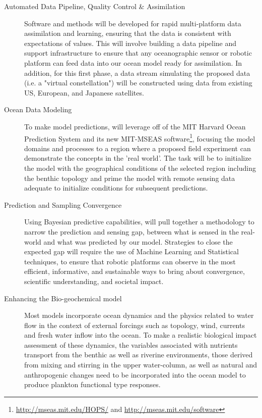 \begin{description}

\item[Automated Data Pipeline, Quality Control \& Assimilation]
  Software and methods will be developed for rapid multi-platform data
  assimilation and learning, ensuring that the data is consistent with
  expectations of values. This will involve building a data pipeline
  and support infrastructure to ensure that any oceanographic sensor
  or robotic platform can feed data into our ocean model ready for
  assimilation. In addition, for this first phase, a data stream
  simulating the proposed \sml data (i.e. a "virtual constellation")
  will be constructed using data from existing US, European, and
  Japanese satellites. %

\item[Ocean Data Modeling] To make model predictions, \pro will
  leverage off of the MIT Harvard Ocean Prediction System and its new
  MIT-MSEAS software\footnote{\url{http://mseas.mit.edu/HOPS/} and
    \url{http://mseas.mit.edu/software}}, focusing the model domains
  and processes to a region where a proposed field experiment can
  demonstrate the concepts in the 'real world'. The task will be to
  initialize the model with the geographical conditions of the
  selected region including the benthic topology and prime the model
  with remote sensing data adequate to initialize conditions for
  subsequent predictions.

\item[Prediction and Sampling Convergence] Using Bayesian predictive
  capabilities, \pro will pull together a methodology to narrow the
  prediction and sensing gap, between what is sensed in the real-world
  and what was predicted by our model. Strategies to close the
  expected gap will require the use of Machine Learning and
  Statistical techniques, to ensure that robotic platforms can observe
  in the most efficient, informative, and sustainable ways to bring
  about convergence, scientific understanding, and societal impact.

\item[Enhancing the Bio-geochemical model] Most models incorporate ocean
  dynamics and the physics related to water flow in the context of
  external forcings such as topology, wind, currents and fresh water
  inflow into the ocean. To make a realistic biological impact
  assessment of these dynamics, the variables associated with nutrients
  transport from the benthic as well as riverine environments, those
  derived from mixing and stirring in the upper water-column, as well as
  natural and anthropogenic changes need to be incorporated into the
  ocean model to produce plankton functional type responses. 


\end{description}
